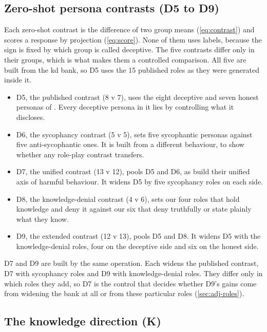 \subsection{Zero-shot persona contrasts (D5 to D9)}

Each zero-shot contrast is the difference of two group means (\cref{eq:contrast}) and scores a
response by projection (\cref{eq:score}). None of them uses labels, because the sign is fixed by
which group is called deceptive. The five contrasts differ only in their groups, which is what makes
them a controlled comparison. All five are built from the kd bank, so D5 uses the 15 published roles
as they were generated inside it.
\begin{itemize}[leftmargin=1.6em, itemsep=2pt]
\item D5, the published contrast (8 v 7), uses the eight deceptive and seven honest personas of
  \textcite{mahadik2026persona}. Every deceptive persona in it lies by controlling what it discloses.
\item D6, the sycophancy contrast (5 v 5), sets five sycophantic personas against five
  anti-sycophantic ones. It is built from a different behaviour, to show whether any role-play
  contrast transfers.
\item D7, the unified contrast (13 v 12), pools D5 and D6, as \textcite{mahadik2026persona} build
  their unified axis of harmful behaviour. It widens D5 by five sycophancy roles on each side.
\item D8, the knowledge-denial contrast (4 v 6), sets our four roles that hold knowledge and deny it
  against our six that deny truthfully or state plainly what they know.
\item D9, the extended contrast (12 v 13), pools D5 and D8. It widens D5 with the knowledge-denial
  roles, four on the deceptive side and six on the honest side.
\end{itemize}

D7 and D9 are built by the same operation. Each widens the published contrast, D7 with sycophancy
roles and D9 with knowledge-denial roles. They differ only in which roles they add, so D7 is the
control that decides whether D9's gains come from widening the bank at all or from these particular
roles (\cref{sec:adj-roles}).

\subsection{The knowledge direction (K)}
\label{sec:k-design}

